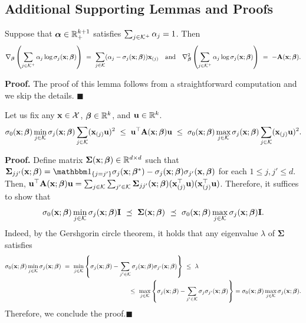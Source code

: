 \subsection{Additional Supporting Lemmas and Proofs}

\begin{lem}
\label{lem:derivative}
Suppose that $\bm{\alpha} \in \mathbb{R}^{k+1}_+$ satisfies $\sum_{j\in\mathcal{K}^+}\alpha_j = 1$. 
Then
$$
\nabla_{\bm{\beta}}\left(
\sum_{j\in\mathcal{K}^+}\alpha_j \log \sigma_{j}(\mathbf{x}; \bm{\beta})
\right) ~=~\sum_{j\in \mathcal{K}}(\alpha_j - \sigma_{j}(\mathbf{x}; \bm{\beta}))\mathbf{x}_{(j)}
~~\text{ 
and }~~
\nabla_{\bm{\beta}}^2\left(
\sum_{j\in\mathcal{K}^+}\alpha_j \log \sigma_{j}(\mathbf{x}; \bm{\beta})
\right) ~=~-\mathbf{A}(\mathbf{x}; \bm{\beta}).
$$
\end{lem}

\noindent
\textbf{Proof.}
    The proof of this lemma follows from a straightforward computation and we skip the details. \hfill $\blacksquare$
    \vspace{3mm}

\begin{lem}
\label{lem:eigen}
    Let us fix any $\mathbf{x}\in \mathcal{X}$, $\bm{\beta} \in \mathbb{R}^{k}$,
    and $\mathbf{u} \in \mathbb{R}^{k}$.
    $$\sigma_{0}(\mathbf{x}; \bm{\beta})
    \min_{j\in \mathcal{K}}\sigma_{j}(\mathbf{x}; \bm{\beta})\sum_{j\in \mathcal{K}}(\mathbf{x}_{(j)} \mathbf{u})^2~\leq~ \mathbf{u}^{\top}\mathbf{A}(\mathbf{x}; \bm{\beta}) \mathbf{u} ~\leq~ \sigma_{0}(\mathbf{x}; \bm{\beta})\max_{j\in \mathcal{K}}\sigma_{j}(\mathbf{x}; \bm{\beta})\sum_{j\in \mathcal{K}}(\mathbf{x}_{(j)} \mathbf{u})^2.
    $$
\end{lem}

\noindent
\textbf{Proof.}
    Define matrix $\bm{\Sigma}(\mathbf{x}; \bm{\beta}) \in \mathbb{R}^{d\times d}$ such that $\bm{\Sigma}_{jj'}(\x; \betavec)=\ind_{\{j = j'\}}\sigma_{j}(\x; \betavec^*) - \sigma_{j}(\x; \betavec)\sigma_{j'}(\x, \betavec)$ for each $1\leq j,j' \leq d$. 
    Then, $\mathbf{u}^{\top}\mathbf{A}(\mathbf{x}; \bm{\beta}) \mathbf{u} = \sum_{j\in \mathcal{K}}\sum_{j'\in \mathcal{K}}\bm{\Sigma}_{jj'}(\mathbf{x}; \bm{\beta})(\mathbf{x}_{(j)}^{\top} \mathbf{u})(\mathbf{x}_{(j)} ^{\top}\mathbf{u})$.
    Therefore, it suffices to  show that $$\sigma_{0}(\mathbf{x}; \bm{\beta}) \min_{j\in \mathcal{K}}\sigma_{j}(\mathbf{x}; \bm{\beta}) \mathbf{I} ~\preceq~ \bm{\Sigma}(\mathbf{x}; \bm{\beta}) ~\preceq~ \sigma_{0}(\mathbf{x}; \bm{\beta})\max_{j\in \mathcal{K}}\sigma_{j}(\mathbf{x}; \bm{\beta}) \mathbf{I}.$$
    Indeed, by the Gershgorin circle theorem, it holds that any eigenvalue $\lambda$ of $\bm{\Sigma}$ satisfies 
    \begin{align*}
        &\sigma_{0}(\mathbf{x}; \bm{\beta})\min_{j\in \mathcal{K}}\sigma_{j}(\mathbf{x}; \bm{\beta})~=~\min_{j\in \mathcal{K}} \left\{\sigma_{j}(\mathbf{x}; \bm{\beta})- \sum_{j' \in \mathcal{K}}\sigma_{j}(\mathbf{x}; \bm{\beta})\sigma_{j'}(\mathbf{x}; \bm{\beta}) \right\}~\leq~ \lambda\\
        &~~~~~~~~~~~~~~~~~~~~~~~~~~~~~~~~~~~~~~~~~~~~~~~~~~~~~~~~~~~~\leq~ \max_{j\in \mathcal{K}} \left\{\sigma_{j}(\mathbf{x}; \bm{\beta})- \sum_{j' \in \mathcal{K}}\sigma_{j}\sigma_{j'}(\mathbf{x}; \bm{\beta}) \right\} = \sigma_{0}(\mathbf{x}; \bm{\beta})\max_{j\in \mathcal{K}}\sigma_{j}(\mathbf{x}; \bm{\beta}).
    \end{align*}
    Therefore, we conclude the proof.\hfill $\blacksquare$
    
